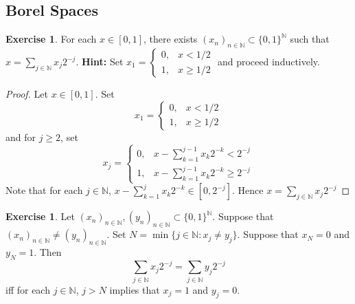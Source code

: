 \documentclass[12pt]{amsart}
\theoremstyle{definition}
\newtheorem{ex}[definition]{Exercise}
\newcommand{\N}{\mathbb{N}}
\newcommand{\lex}[1]{\label{ex:#1}}
\begin{document}
	\newpage
	\subsection{Borel Spaces}
	
	\begin{ex} \lex{28001} 
		For each $x \in [0, 1]$, there exists $(x_n)_{n \in \N} \subset \{0,1\}^{\N}$ such that $x = \sum\limits_{j \in \N} x_j2^{-j}$.
		\textbf{Hint:} Set $x_1 = 
		\begin{cases}
			0, & x < 1/2 \\
			1, & x \geq 1/2 
		\end{cases}$
		and proceed inductively. 
	\end{ex}

	\begin{proof}
		Let $x \in [0,1]$. Set 
		$$x_1 = 
		\begin{cases}
			0, & x < 1/2 \\
			1, & x \geq 1/2 
		\end{cases}$$
	and for $j \geq 2$, set 
	$$x_j = \begin{cases}
		0, & x - \sum\limits_{k = 1}^{j-1}x_k2^{-k} < 2^{-j} \\
		1, & x - \sum\limits_{k = 1}^{j-1}x_k2^{-k} \geq 2^{-j} 
	\end{cases}$$
	Note that for each $j \in \N$, $x - \sum\limits_{k = 1}^{j}x_k2^{-k} \in [0, 2^{-j}]$. Hence $x = \sum\limits_{j \in \N} x_j2^{-j}$
	\end{proof}

	\begin{ex} \lex{28002} 
		Let $(x_n)_{n \in \N}, (y_n)_{n \in \N} \subset \{0,1\}^{\N}$. Suppose that $(x_n)_{n \in \N} \neq (y_n)_{n \in \N}$. Set $N = \min\{j \in \N: x_j \neq y_j\}$. Suppose that $x_N = 0$ and $y_N = 1$. Then
		$$\sum\limits_{j \in \N} x_j 2^{-j} = \sum\limits_{j \in \N} y_j 2^{-j}$$ 
		iff for each $j \in \N$, $j > N$ implies that $x_j = 1$ and $y_j = 0$. 
	\end{ex}
\end{document}
